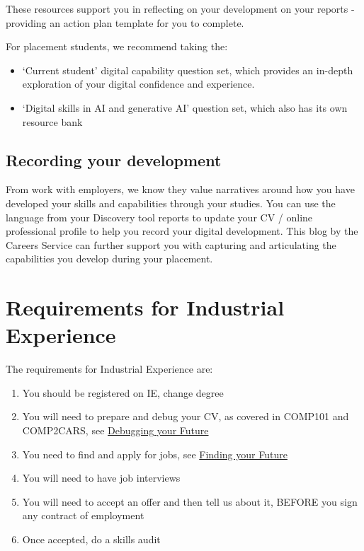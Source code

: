 \documentclass[
]{book}
\providecommand{\tightlist}{%
  \setlength{\itemsep}{0pt}\setlength{\parskip}{0pt}}
\begin{document}
These resources support you in reflecting on your development on your reports - providing an action plan template for you to complete.

For placement students, we recommend taking the:

\begin{itemize}
\tightlist
\item
  `Current student' digital capability question set, which provides an in-depth exploration of your digital confidence and experience.
\item
  `Digital skills in AI and generative AI' question set, which also has its own resource bank
\end{itemize}

\section{Recording your development}\label{recording-your-development}

From work with employers, we know they value narratives around how you have developed your skills and capabilities through your studies. You can use the language from your Discovery tool reports to update your CV / online professional profile to help you record your digital development. This blog by the Careers Service can further support you with capturing and articulating the capabilities you develop during your placement. \citep{conway}

\chapter{Requirements for Industrial Experience}\label{requirements-for-industrial-experience}

The requirements for Industrial Experience are:

\begin{enumerate}
\def\labelenumi{\arabic{enumi}.}
\tightlist
\item
  You should be registered on IE, change degree \href{studentnet.cs.manchester.ac.uk/ugt/changedegree.php}{}
\item
  You will need to prepare and debug your CV, as covered in COMP101 and COMP2CARS, see \href{https://www.cdyf.me/debugging}{Debugging your Future} \citep{debugging}
\item
  You need to find and apply for jobs, see \href{https://www.cdyf.me/finding}{Finding your Future} \citep{finding}
\item
  You will need to have job interviews
\item
  You will need to accept an offer and then tell us about it, BEFORE you sign any contract of employment
\item
  Once accepted, do a skills audit
\end{enumerate}
\end{document}
